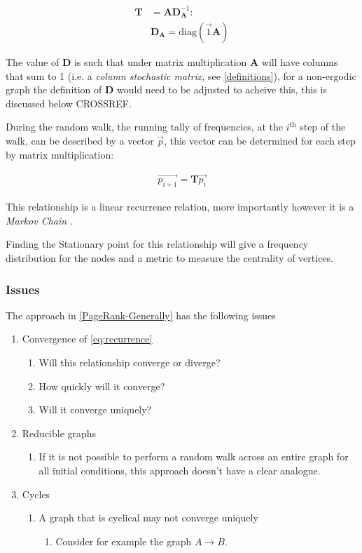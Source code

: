 \documentclass[11pt]{article}
\begin{document}
\begin{align}
\mathbf{T} &= \mathbf{A} \mathbf{D}^{-1}_{\mathbf{A}} \label{eq:basic-trans-def} : \\
& \mathbf{D}_{\mathbf{A}} = \mathrm{diag}\left(\vec{1} \mathbf{A}\right) \label{eq:diagScaleDef}
\end{align}

The value of \(\mathbf{D}\) is such that under matrix multiplication \(\mathbf{A}\) will have columns that sum to 1 (i.e. a \emph{column stochastic matrix}, see \textsection \ref{definitions}), for a non-ergodic graph the definition of \(\mathbf{D}\) would need to be adjusted to acheive this, this is discussed below CROSSREF.

During the random walk, the running tally of frequencies, at the \(i^{\mathrm{th}}\) step of the walk, can be described by a vector \(\vec{p}\), this vector can be determined for each step by matrix multiplication:

\begin{align}
\vec{p_{i+1}} = \mathbf{T}\vec{p_{i}} \label{eq:recurrence}
\end{align}

This relationship is a linear recurrence relation, more importantly however it is a \emph{Markov Chain} \cite[]{langvilleGooglePageRankScience2012}.

Finding the Stationary point for this relationship will give a frequency distribution for the nodes and a metric to measure the centrality of vertices.

\subsubsection{Issues}
\label{issues}
The approach in \ref{PageRank-Generally} has the following issues

\begin{enumerate}
\item Convergence of \eqref{eq:recurrence}
\begin{enumerate}
\item Will this relationship converge or diverge?
\item How quickly will it converge?
\item Will it converge uniquely?
\end{enumerate}
\item Reducible graphs
\begin{enumerate}
\item If it is not possible to perform a random walk across an entire graph for all initial conditions, this approach doesn't have a clear analogue.
\end{enumerate}
\item Cycles
\begin{enumerate}
\item A graph that is cyclical may not converge uniquely
\begin{enumerate}
\item Consider for example the graph \(A\rightarrow B\).
\end{enumerate}
\end{enumerate}
\end{enumerate}
\end{document}
